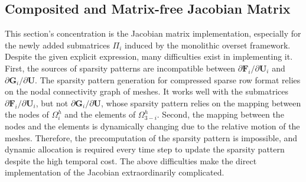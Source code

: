 \documentclass[preprint,12pt,sort&compress]{elsarticle}
\theoremstyle{definition}%
\begin{document}
\subsection{Composited and Matrix-free Jacobian Matrix}
This section's concentration is the Jacobian matrix implementation, especially for the newly added submatrices $\Pi_i$ induced by the monolithic overset framework.
Despite the given explicit expression, many difficulties exist in implementing it.
First, the sources of sparsity patterns are incompatible between $\partial \bm{F}_i/\partial \bm{U}_{i}$ and $\partial \bm{G}_i/\partial \bm{U}$.
The sparsity pattern generation for compressed sparse row format relies on the nodal connectivity graph of meshes.
It works well with the submatrices $\partial \bm{F}_i/\partial \bm{U}_{i}$, but not $\partial \bm{G}_i /\partial \bm{U}$,
whose sparsity pattern relies on the mapping between the nodes of $\Omega_i^h$ and the elements of $\Omega_{3-i}^h$.
Second, the mapping between the nodes and the elements is dynamically changing due to the relative motion of the meshes.
Therefore, the precomputation of the sparsity pattern is impossible, and dynamic allocation is required every time step to update the sparsity pattern despite the high temporal cost.
The above difficulties make the direct implementation of the Jacobian extraordinarily complicated. \\
\end{document}
